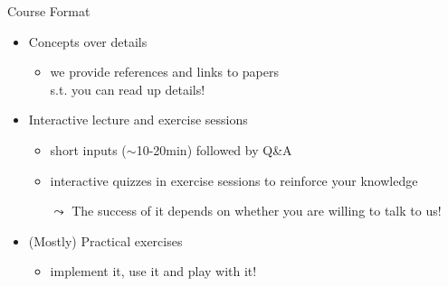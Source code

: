 \documentclass[aspectratio=169]{../latex_main/tntbeamer}  %
\begin{document}
\begin{frame}[c]{Course Format}
	
	\begin{itemize}
		\item Concepts over details
		\begin{itemize}
			\item we provide references and links to papers\\ s.t. you can read up details!
		\end{itemize}
		\smallskip
		\item Interactive lecture and exercise sessions
		\begin{itemize}
			\item short inputs ($\sim$10-20min) followed by Q\&A
			\item interactive quizzes in exercise sessions to reinforce your knowledge
			\item[$\leadsto$] The success of it depends on whether you are willing to talk to us! 
		\end{itemize}
		\smallskip
		\item (Mostly) Practical exercises
		\begin{itemize}
			\item implement it, use it and play with it!
		\end{itemize}
	\end{itemize}
	
\end{frame}
\end{document}
